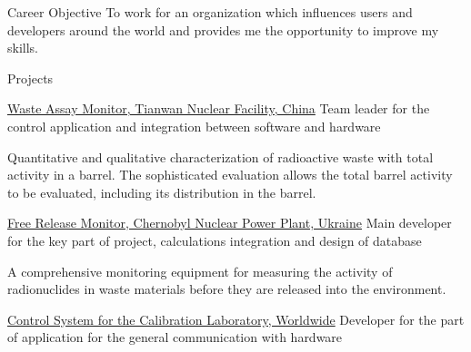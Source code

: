 \documentclass{cv} %
\begin{document}
\begin{rSection}{Career Objective}
 To work for an organization which influences users and developers around the world and provides me the opportunity to improve my skills.
\end{rSection}
\begin{rSection}{Projects}
\begin{rSubsection}
{\href{https://www.vfnuclear.com/en/products/waste-assay-monitor}{Waste Assay Monitor, Tianwan Nuclear Facility, China}}{}
{Team leader for the control application and integration between software and hardware}{}

Quantitative and qualitative characterization of radioactive waste with total activity in a barrel. The sophisticated evaluation allows the total barrel activity to be evaluated, including its distribution in the barrel.
\end{rSubsection}

\begin{rSubsection}
{\href{https://www.vfnuclear.com/en/free-release-monitor-frm-03-delivery-for-chernobyl-npp}{Free Release Monitor, Chernobyl Nuclear Power Plant, Ukraine}}{}
{Main developer for the key part of project, calculations integration and design of database}{}

A comprehensive monitoring equipment for measuring the activity of radionuclides in waste materials before they are released into the environment.
\end{rSubsection}



\begin{rSubsection}
{\href{https://www.vf.cz/en/products/dars-control-system-for-the-calibration-laboratory-dars}{Control System for the Calibration Laboratory, Worldwide}}{}
{Developer for the part of application for the general communication with hardware}{}


\end{rSubsection}
\end{rSection}
\end{document}
